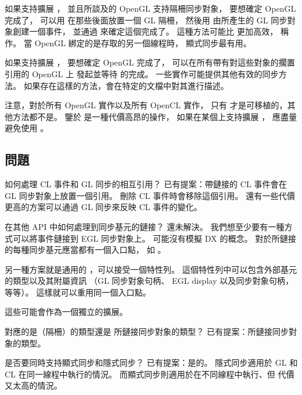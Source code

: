 如果支持擴展 ，
並且所談及的 OpenGL 支持隔柵同步對象，
要想確定 OpenGL 完成了，
可以用  在那些後面放置一個 GL 隔柵，
然後用  由所產生的 GL 同步對象創建一個事件，
並通過  來確定這個完成了。
這種方法可能比  更加高效，
稱作{}。
當 OpenGL 綁定的是存取的另一個線程時，
顯式同步最有用。

如果支持擴展 ，
要想確定 OpenGL 完成了，
可以在所有帶有對這些對象的擱置引用的 OpenGL 上
發起並等待  的完成。
一些實作可能提供其他有效的同步方法。
如果存在這樣的方法，會在特定的文檔中對其進行描述。

注意，對於所有 OpenGL 實作以及所有 OpenCL 實作，
只有  才是可移植的，其他方法都不是。
鑒於  是一種代價高昂的操作，
如果在某個上支持擴展 ，
應盡量避免使用 。
\stopreplacepar

\subsection{問題}

\startQUESTION
如何處理 CL 事件和 GL 同步的相互引用？
\stopQUESTION
\startANSWER
已有提案：帶鏈接的 CL 事件會在 GL 同步對象上放置一個引用。
刪除 CL 事件時會移除這個引用。
還有一些代價更高的方案可以通過 GL 同步來反映 CL 事件的變化。
\stopANSWER

\startQUESTION
在其他 API 中如何處理到同步基元的鏈接？
\stopQUESTION
\startANSWER
還未解決。
我們想至少要有一種方式可以將事件鏈接到 EGL 同步對象上。
可能沒有模擬 DX 的概念。
對於所鏈接的每種同步基元應當都有一個入口點，
如 。

另一種方案就是通用的 ，可以接受一個特性列。
這個特性列中可以包含外部基元的類型以及其附屬資訊
（GL 同步對象句柄、 EGL display 以及同步對象句柄，等等）。
這樣就可以重用同一個入口點。

這些可能會作為一個獨立的擴展。
\stopANSWER

\startQUESTION
{} 對應的是（隔柵）的類型還是
所鏈接同步對象的類型？
\stopQUESTION
\startANSWER
已有提案：所鏈接同步對象的類型。
\stopANSWER

\startQUESTION
是否要同時支持顯式同步和隱式同步？
\stopQUESTION
\startANSWER
已有提案：是的。
隱式同步適用於 GL 和 CL 在同一線程中執行的情況。
而顯式同步則適用於在不同線程中執行、但  代價又太高的情況。
\stopANSWER

